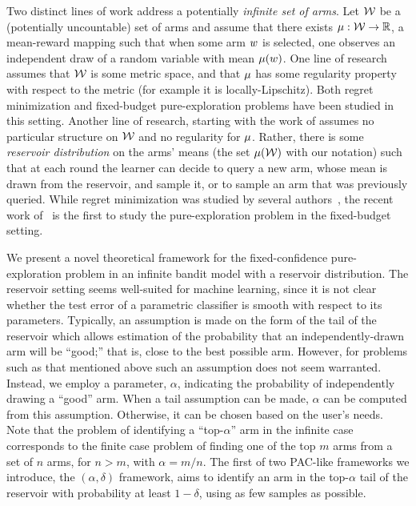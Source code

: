 Two distinct lines of work address a
potentially \emph{infinite set of arms}. Let $\mathcal{W}$ be a (potentially
uncountable) set of arms and assume that there exists $\mu : \mathcal{W} \rightarrow
\mathbb{R}$, a mean-reward mapping such that when some arm $w$ is selected, one observes
an independent draw of a random variable with mean $\mu(w)$.
One line of research
\citep{Kleinberg08Infinite,Bubeck11Xarmed,grill2015black-box}
assumes that $\mathcal{W}$ is some
metric space, and that $\mu$ has some regularity property with respect to the
metric (for example it is locally-Lipschitz). Both regret minimization and
fixed-budget pure-exploration problems have been studied in this setting.
Another line of research, starting with the work
of \cite{berry1997} assumes no particular structure on $\mathcal{W}$ and no regularity
for $\mu$. Rather, there is some \emph{reservoir distribution} on the arms'
means (the set $\mu(\mathcal{W})$ with our notation) such that at each round the
learner can decide to query a new arm, whose mean is drawn from the reservoir,
and sample it, or to sample an arm that was previously queried. While regret
minimization was studied by several authors~\citep{wang2008,
bonald2013two,david2014infinitely}, the recent work
of~\cite{DBLP:journals/corr/CarpentierV15} is the first to study the
pure-exploration problem in the fixed-budget setting.


We present a novel theoretical framework for the
fixed-confidence pure-exploration problem in an infinite bandit model with a
reservoir distribution.
The reservoir setting seems well-suited for machine learning, since it is not clear whether the
test error of a parametric classifier is smooth with respect to its parameters.
Typically, an assumption is made on the form of the tail of the reservoir which allows
estimation of the probability that an independently-drawn arm will be
``good;'' that is, close to the best possible arm.
However, for problems 
such as that mentioned above
 such an assumption does not seem warranted.
Instead, we employ a parameter, $\alpha$, indicating the probability of
independently drawing a ``good'' arm.
When a tail assumption can be made, $\alpha$ can be computed from this
assumption. Otherwise, it can be chosen based on the user's needs.
Note that the problem of identifying a ``top-$\alpha$'' arm in the infinite
case corresponds to the finite case problem of
finding one of the top $m$ arms from a set of $n$ arms, for $n>m$,
with $\alpha = m/n$.
The first of two PAC-like frameworks we introduce, the $(\alpha,\delta)$
framework,
aims to identify an arm in the top-$\alpha$ tail of the reservoir with 
probability at least $1-\delta$, using as few samples as
possible.

